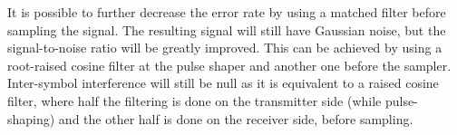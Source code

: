 
%
%
%
%
%



It is possible to further decrease the error rate by using a matched filter before sampling the signal. The resulting signal will still have Gaussian noise, but the signal-to-noise ratio will be greatly improved. This can be achieved by using a root-raised cosine filter at the pulse shaper and another one before the sampler. Inter-symbol interference will still be null as it is equivalent to a raised cosine filter, where half the filtering is done on the transmitter side (while pulse-shaping) and the other half is done on the receiver side, before sampling.

